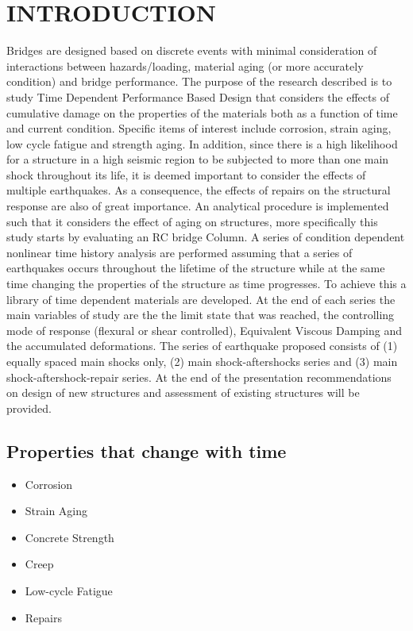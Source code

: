 \chapter{INTRODUCTION}
\label{chap-one}

Bridges are designed based on discrete events with minimal consideration of interactions between hazards/loading, material aging (or more accurately condition) and bridge performance. The purpose of the research described is to study Time Dependent Performance Based Design that considers the effects of cumulative damage on the properties of the materials both as a function of time and current condition. Specific items of interest include corrosion, strain aging, low cycle fatigue and strength aging. In addition, since there is a high likelihood for a structure  in a high seismic region to be subjected to more than one main shock throughout its life, it is deemed important to consider the effects of multiple earthquakes. As a consequence, the effects of repairs on the structural response are also of great importance. An analytical procedure is implemented such that it considers the effect of aging on structures, more specifically this study starts by evaluating an RC bridge Column. A series of condition dependent nonlinear time history analysis are performed assuming that a series of earthquakes occurs throughout the lifetime of the structure while at the same time changing the properties of the structure as time progresses. To achieve this a library of time dependent materials are developed. At the end of each series the main variables of study are the the limit state that was reached, the controlling mode of response (flexural or shear controlled), Equivalent Viscous Damping and the accumulated deformations. The series of earthquake proposed consists of (1) equally spaced main shocks only, (2) main shock-aftershocks series and (3) main shock-aftershock-repair series. At the end of the presentation recommendations on design of new structures and assessment of existing structures will be provided.

\section{Properties that change with time}

\begin{itemize}
   \item Corrosion
   \item Strain Aging
   \item Concrete Strength
   \item Creep
   \item Low-cycle Fatigue
   \item Repairs
\end{itemize}

